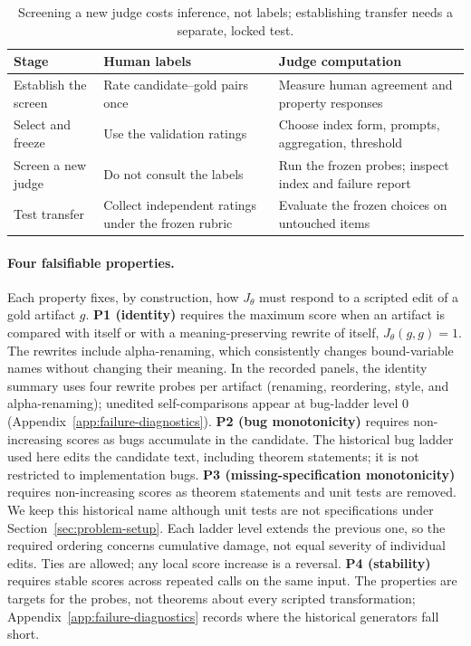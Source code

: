\begin{table}[t]
\centering\small
\begin{tabularx}{\linewidth}{@{}lXX@{}}
\toprule
Stage & Human labels & Judge computation \\
\midrule
Establish the screen & Rate candidate--gold pairs once & Measure human agreement and property responses \\
Select and freeze & Use the validation ratings & Choose index form, prompts, aggregation, threshold \\
Screen a new judge & Do not consult the labels & Run the frozen probes; inspect index and failure report \\
Test transfer & Collect independent ratings under the frozen rubric & Evaluate the frozen choices on untouched items \\
\bottomrule
\end{tabularx}
\caption{Screening a new judge costs inference, not labels; establishing transfer needs a separate, locked test.}
\label{tab:protocol_workflow}
\end{table}

\paragraph{Four falsifiable properties.}
Each property fixes, by construction, how $J_\theta$ must respond to a scripted edit of a gold artifact $g$.
\textbf{P1 (identity)} requires the maximum score when an artifact is compared with itself or with a meaning-preserving rewrite of itself, $J_\theta(g,g)=1$.
The rewrites include alpha-renaming, which consistently changes bound-variable names without changing their meaning.
In the recorded panels, the identity summary uses four rewrite probes per artifact (renaming, reordering, style, and alpha-renaming); unedited self-comparisons appear at bug-ladder level 0 (Appendix~\ref{app:failure-diagnostics}).
\textbf{P2 (bug monotonicity)} requires non-increasing scores as bugs accumulate in the candidate.
The historical bug ladder used here edits the candidate text, including theorem statements; it is not restricted to implementation bugs.
\textbf{P3 (missing-specification monotonicity)} requires non-increasing scores as theorem statements and unit tests are removed.
We keep this historical name although unit tests are not specifications under Section~\ref{sec:problem-setup}.
Each ladder level extends the previous one, so the required ordering concerns cumulative damage, not equal severity of individual edits.
Ties are allowed; any local score increase is a reversal.
\textbf{P4 (stability)} requires stable scores across repeated calls on the same input.
The properties are targets for the probes, not theorems about every scripted transformation; Appendix~\ref{app:failure-diagnostics} records where the historical generators fall short.


